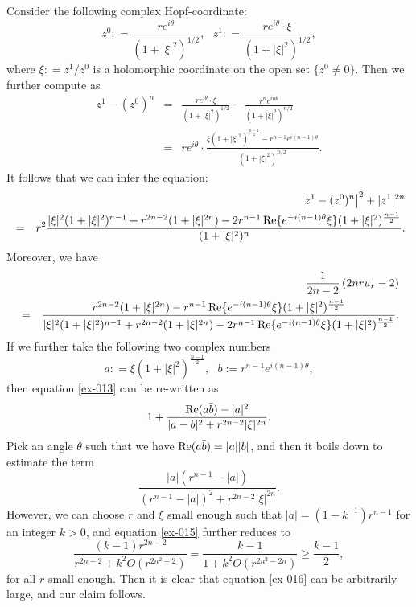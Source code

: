 \documentclass[a4paper,11pt]{amsart}
\numberwithin{equation}{section}
\def\Re{\mathop{\rm Re}\nolimits}
\begin{document}
Consider the following complex Hopf-coordinate: 
$$ z^0: = \frac{ r e^{i\theta}}{(1+ |\xi|^2)^{1/2}}, \ \ \  z^1: =  \frac{ r e^{i\theta} \cdot \xi }{(1+ |\xi|^2)^{1/2}},$$
where $\xi: = z^1 / z^0 $ is a holomorphic coordinate on the open set $\{z^0 \neq 0 \}$. 
Then we further compute as 
\begin{eqnarray}
\label{ex-011}
z^1- (z^0)^n &=& \frac{ r e^{i\theta} \cdot \xi }{(1+ |\xi|^2)^{1/2}} - \frac{ r^n e^{in\theta}  }{(1+ |\xi|^2)^{n/2}}
\nonumber\\
&=&  re^{i\theta} \cdot   \frac{ \xi (1+ |\xi|^2)^{\frac{n-1}{2}} - r^{n-1} e^{i(n-1)\theta} }{ (1 + |\xi|^2)^{n/2}}. 
\end{eqnarray}
It follows that we can infer the equation: 
\begin{eqnarray}
\label{ex-012}
&& \left| z^1- (z^0)^n \right|^2 + |z^1|^{2n}  
\nonumber\\ 
&=& r^2 \frac{|\xi|^2(1+ |\xi|^2)^{n-1}  + r^{2n-2}(1+ |\xi|^{2n})  - 2 r^{n-1}\Re\{e^{-i(n-1)\theta}\xi \} (1+ |\xi|^2)^{\frac{n-1}{2}} }{(1+ |\xi|^2)^n}.
\nonumber\\
\end{eqnarray}
Moreover, we have 
\begin{eqnarray}
\label{ex-013}
&& \frac{1}{2n-2} \left( 2nru_r -2 \right)  
\nonumber\\ 
&=& \frac{r^{2n-2}(1+ |\xi|^{2n}) -  r^{n-1} \Re\{e^{-i(n-1)\theta}\xi \} (1+ |\xi|^2)^{\frac{n-1}{2}}  }
{|\xi|^2(1+ |\xi|^2)^{n-1}  + r^{2n-2}(1+ |\xi|^{2n})  - 2 r^{n-1}\Re\{e^{-i(n-1)\theta}\xi \} (1+ |\xi|^2)^{\frac{n-1}{2}} }.
\nonumber\\
\end{eqnarray}
If we further take the following two complex numbers 
$$a: = \xi (1+ |\xi|^2)^{\frac{n-1}{2}}, \ \ \ b:= r^{n-1} e^{i(n-1)\theta}, $$
then equation \eqref{ex-013} can be re-written as  
\begin{equation}
\label{ex-014}
 1+ \frac{\Re(a\bar b) - |a|^2}{| a- b|^2 + r^{2n-2}|\xi|^{2n}}.
\end{equation}
Pick an angle $\theta$ such that we have $\Re(a\bar b)= |a||b|$, 
and then it boils down to estimate the term 
\begin{equation}
\label{ex-015}
\frac{|a| (r^{n-1}-|a|)}{ \left(r^{n-1} - |a| \right)^2 + r^{2n-2}|\xi|^{2n}}.
\end{equation}
However, we can choose $r$ and $\xi$ small enough such that $|a| = (1- k^{-1})r^{n-1}$ for an integer $k>0$,
and equation \eqref{ex-015} further reduces to  
\begin{equation}
\label{ex-016}
\frac{ (k-1) r^{2n-2}}{  r^{2n-2} + k^2 O(r^{2n^2-2})} = \frac{k-1}{1+ k^2 O(r^{2n^2 -2n})} \geq \frac{k-1}{2},
\end{equation}
for all $r$ small enough. 
Then it is clear that equation \eqref{ex-016} can be arbitrarily large, 
and our claim follows. 
\end{document}
